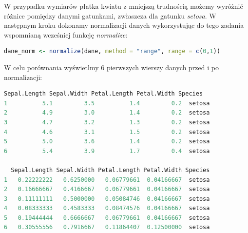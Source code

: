 \documentclass[a4paper]{article}
\begin{document}
W przypadku wymiarów płatka kwiatu z mniejszą trudnością możemy wyróżnić różnice pomiędzy danymi gatunkami, zwłaszcza dla gatunku \textit{setosa}. W następnym kroku dokonamy normalizacji danych wykorzystując do tego zadania wspomnianą wcześniej funkcję \textit{normalize}:
\begin{lstlisting}[language=R,frame=single]
dane_norm <- normalize(dane, method = "range", range = c(0,1))
\end{lstlisting}\newpage
W celu porównania wyświetlmy 6 pierwszych wierszy danych przed i po normalizacji:
\begin{lstlisting}[language=R,frame=single]
  Sepal.Length Sepal.Width Petal.Length Petal.Width Species
1          5.1         3.5          1.4         0.2  setosa
2          4.9         3.0          1.4         0.2  setosa
3          4.7         3.2          1.3         0.2  setosa
4          4.6         3.1          1.5         0.2  setosa
5          5.0         3.6          1.4         0.2  setosa
6          5.4         3.9          1.7         0.4  setosa

  Sepal.Length Sepal.Width Petal.Length Petal.Width Species
1   0.22222222   0.6250000   0.06779661  0.04166667  setosa
2   0.16666667   0.4166667   0.06779661  0.04166667  setosa
3   0.11111111   0.5000000   0.05084746  0.04166667  setosa
4   0.08333333   0.4583333   0.08474576  0.04166667  setosa
5   0.19444444   0.6666667   0.06779661  0.04166667  setosa
6   0.30555556   0.7916667   0.11864407  0.12500000  setosa
\end{lstlisting}
\end{document}
